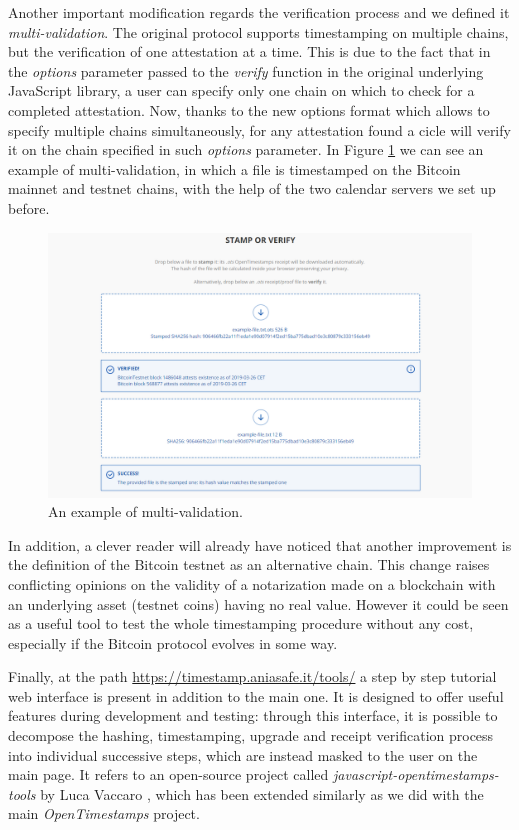 \bigskip
\noindent
Another important modification regards the verification process and we defined it \textit{multi-validation}. The original protocol supports timestamping on multiple chains, but the verification of one attestation at a time. This is due to the fact that in the \textit{options} parameter passed to the \textit{verify} function in the original underlying JavaScript library, a user can specify only one chain on which to check for a completed attestation. Now, thanks to the new options format which allows to specify multiple chains simultaneously, for any attestation found a cicle will verify it on the chain specified in such \textit{options} parameter. In Figure \ref{fig:multivalidation} we can see an example of multi-validation, in which a file is timestamped on the Bitcoin mainnet and testnet chains, with the help of the two calendar servers we set up before.

\begin{figure}[ht]
    \centering
	\includegraphics[width=1\linewidth]{Images/multivalidation.png}
	\caption{An example of multi-validation.}
	\label{fig:multivalidation}
\end{figure}

\bigskip
\noindent
In addition, a clever reader will already have noticed that another improvement is the definition of the Bitcoin testnet as an alternative chain. This change raises conflicting opinions on the validity of a notarization made on a blockchain with an underlying asset (testnet coins) having no real value. However it could be seen as a useful tool to test the whole timestamping procedure without any cost, especially if the Bitcoin protocol evolves in some way.

\bigskip
\noindent
Finally, at the path \url{https://timestamp.aniasafe.it/tools/} a step by step tutorial 
web interface is present in addition to the main one. It is designed to offer useful features during development and testing: through this interface, it is possible to decompose the hashing, timestamping, upgrade and receipt verification process into individual successive steps, which are instead masked to the user on the main page. It refers to an open-source project called \textit{javascript-opentimestamps-tools} by Luca Vaccaro \cite{OTStools}, which has been extended similarly as we did with the main \textit{OpenTimestamps} project.